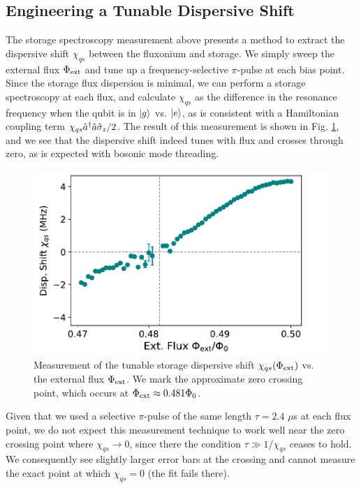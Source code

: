 \subsection{Engineering a Tunable Dispersive Shift}

The storage spectroscopy measurement above presents a method to extract the dispersive shift $\chi_{qs}$ between the fluxonium and storage. We simply sweep the external flux $\Phi_{\rm ext}$ and tune up a frequency-selective $\pi$-pulse at each bias point. Since the storage flux dispersion is minimal, we can perform a storage spectroscopy at each flux, and calculate $\chi_{qs}$ as the difference in the resonance frequency when the qubit is in $\lvert g\rangle$ vs. $\lvert e\rangle$, as is consistent with a Hamiltonian coupling term $\chi_{qs} \hat{a}^\dagger\hat{a}\hat{\sigma}_z/2$. The result of this measurement is shown in Fig. \ref{fig:4_tunable_chi}, and we see that the dispersive shift indeed tunes with flux and crosses through zero, as is expected with bosonic mode threading. 

\begin{figure}[h]
    \centering
    \includegraphics[width=0.6\linewidth]{Figures/4/tunable_chi.pdf}
    \caption[Demonstration of a flux-tunable storage dispersive shift.]{Measurement of the tunable storage dispersive shift $\chi_{qs}(\Phi_{\rm ext})$ vs. the external flux $\Phi_{\rm ext}$. We mark the approximate zero crossing point, which occurs at $\Phi_{\rm ext} \approx 0.481\Phi_0$.}
    \label{fig:4_tunable_chi}
\end{figure}

Given that we used a selective $\pi$-pulse of the same length $\tau = 2.4$ $\mu$s at each flux point, we do not expect this measurement technique to work well near the zero crossing point where $\chi_{qs} \to 0$, since there the condition $\tau \gg 1/\chi_{qs}$ ceases to hold. We consequently see slightly larger error bars at the crossing and cannot measure the exact point at which $\chi_{qs}=0$ (the fit fails there). 

\clearpage

